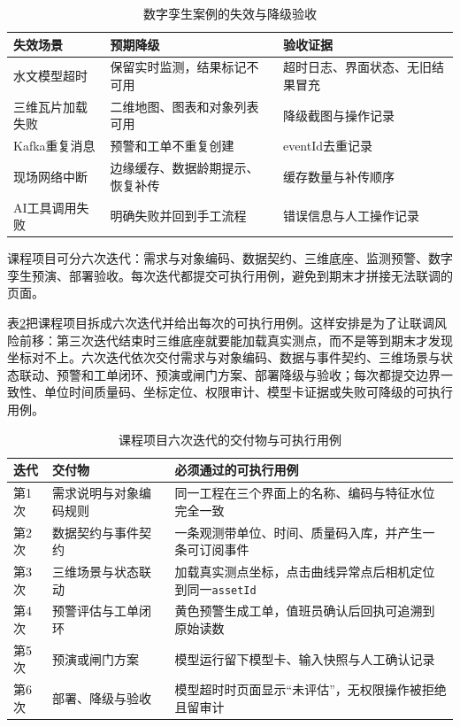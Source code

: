\begin{table}[htbp]
\centering
\caption{数字孪生案例的失效与降级验收}
\label{tab:twin-failure-acceptance}
\begin{tabular}{p{2.7cm}p{4.2cm}p{5.5cm}}
\toprule
失效场景 & 预期降级 & 验收证据 \\
\midrule
水文模型超时 & 保留实时监测，结果标记不可用 & 超时日志、界面状态、无旧结果冒充 \\
三维瓦片加载失败 & 二维地图、图表和对象列表可用 & 降级截图与操作记录 \\
Kafka重复消息 & 预警和工单不重复创建 & eventId去重记录 \\
现场网络中断 & 边缘缓存、数据龄期提示、恢复补传 & 缓存数量与补传顺序 \\
AI工具调用失败 & 明确失败并回到手工流程 & 错误信息与人工操作记录 \\
\bottomrule
\end{tabular}
\end{table}

课程项目可分六次迭代：需求与对象编码、数据契约、三维底座、监测预警、数字孪生预演、部署验收。每次迭代都提交可执行用例，避免到期末才拼接无法联调的页面。

表\ref{tab:ch08-course-iterations}把课程项目拆成六次迭代并给出每次的可执行用例。这样安排是为了让联调风险前移：第三次迭代结束时三维底座就要能加载真实测点，而不是等到期末才发现坐标对不上。六次迭代依次交付需求与对象编码、数据与事件契约、三维场景与状态联动、预警和工单闭环、预演或闸门方案、部署降级与验收；每次都提交边界一致性、单位时间质量码、坐标定位、权限审计、模型卡证据或失败可降级的可执行用例。

\begin{table}[htbp]
\centering
\caption{课程项目六次迭代的交付物与可执行用例}
\label{tab:ch08-course-iterations}
\begin{tabular}{p{1.5cm}p{5.0cm}p{6.2cm}}
\toprule
迭代 & 交付物 & 必须通过的可执行用例 \\
\midrule
第1次 & 需求说明与对象编码规则 & 同一工程在三个界面上的名称、编码与特征水位完全一致 \\
第2次 & 数据契约与事件契约 & 一条观测带单位、时间、质量码入库，并产生一条可订阅事件 \\
第3次 & 三维场景与状态联动 & 加载真实测点坐标，点击曲线异常点后相机定位到同一\texttt{assetId} \\
第4次 & 预警评估与工单闭环 & 黄色预警生成工单，值班员确认后回执可追溯到原始读数 \\
第5次 & 预演或闸门方案 & 模型运行留下模型卡、输入快照与人工确认记录 \\
第6次 & 部署、降级与验收 & 模型超时时页面显示“未评估”，无权限操作被拒绝且留审计 \\
\bottomrule
\end{tabular}
\end{table}

